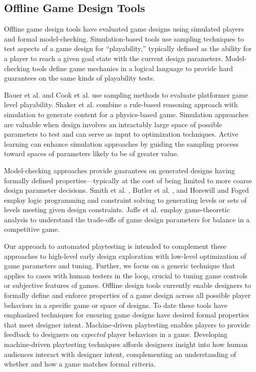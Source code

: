 \documentclass{sig-alternate}
\begin{document}
\subsection{Offline Game Design Tools}
Offline game design tools have evaluated game designs using simulated players and formal model-checking.
Simulation-based tools use sampling techniques to test aspects of a game design for ``playability,'' typically defined as the ability for a player to reach a given goal state with the current design parameters.
Model-checking tools define game mechanics in a logical language to provide hard guarantees on the same kinds of playability tests.

Bauer et al. \cite{bauer2013:rrt-generation} and Cook et al. \cite{cook2012:coopcoevo} use sampling methods to evaluate platformer game level playability.
Shaker et al. \cite{shaker2013:ropossum-test} combine a rule-based reasoning approach with simulation to generate content for a physics-based game.
Simulation approaches are valuable when design involves an intractably large space of possible parameters to test and can serve as input to optimization techniques.
Active learning can enhance simulation approaches by guiding the sampling process toward spaces of parameters likely to be of greater value.

Model-checking approaches provide guarantees on generated designs having formally defined properties---typically at the cost of being limited to more coarse design parameter decisions.
Smith et al. \cite{smith2013:quantify-play}, Butler et al. \cite{butler2013:progression-tool}, and Horswill and Foged \cite{horswill2012:levelgen} employ logic programming and constraint solving to generating levels or sets of levels meeting given design constraints.
Jaffe et al. \cite{jaffe2012:balance} employ game-theoretic analysis to understand the trade-offs of game design parameters for balance in a competitive game.

Our approach to automated playtesting is intended to complement these approaches to high-level early design exploration with low-level optimization of game parameters and tuning.
Further, we focus on a generic technique that applies to cases with human testers in the loop, crucial to tuning game controls or subjective features of games.
%
Offline design tools currently enable designers to formally define and enforce properties of a game design across all possible player behaviors in a specific game or space of designs.
To date these tools have emphasized techniques for ensuring game designs have desired formal properties that meet designer intent.
%
Machine-driven playtesting enables players to provide feedback to designers on \textit{expected} player behaviors in a game.
Developing machine-driven playtesting techniques affords designers insight into how human audiences interact with designer intent, complementing an understanding of whether and how a game matches formal criteria.
\end{document}

